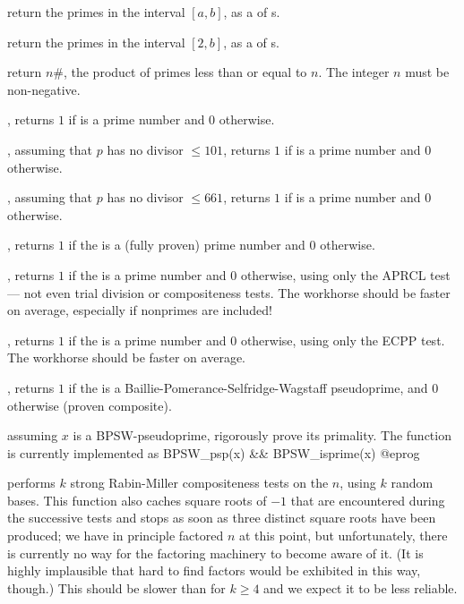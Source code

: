  return the primes in the
interval $[a,b]$, as a  of s.

 return the primes in the interval $[2,b]$,
as a  of s.

 return $n\#$, the product of primes less than
or equal to $n$. The integer $n$ must be non-negative.


, returns $1$ if  is a prime number and
$0$ otherwise.

, assuming that $p$ has no divisor $\leq
101$, returns $1$ if  is a prime number and $0$ otherwise.

, assuming that $p$ has no divisor $\leq
661$, returns $1$ if  is a prime number and $0$ otherwise.

, returns $1$ if the   is a
(fully proven) prime number and $0$ otherwise.

, returns $1$ if the   is a
prime number and $0$ otherwise, using only the APRCL test --- not even trial
division or compositeness tests. The workhorse  should be
faster on average, especially if nonprimes are included!

, returns $1$ if the   is a
prime number and $0$ otherwise, using only the ECPP test. The workhorse
 should be faster on average.

, returns $1$ if the   is a
Baillie-Pomerance-Selfridge-Wagstaff pseudoprime, and $0$ otherwise (proven
composite).

 assuming $x$ is a BPSW-pseudoprime, rigorously
prove its primality. The function  is currently implemented
as
\bprog
 BPSW_psp(x) && BPSW_isprime(x)
@eprog

 performs $k$ strong Rabin-Miller
compositeness tests on the  $n$, using $k$ random bases. This
function also caches square roots of $-1$ that are encountered during the
successive tests and stops as soon as three distinct square roots have been
produced; we have in principle factored $n$ at this point, but
unfortunately, there is currently no way for the factoring machinery to
become aware of it. (It is highly implausible that hard to find factors
would be exhibited in this way, though.) This should be slower than
 for $k\geq 4$ and we expect it to be less reliable.

